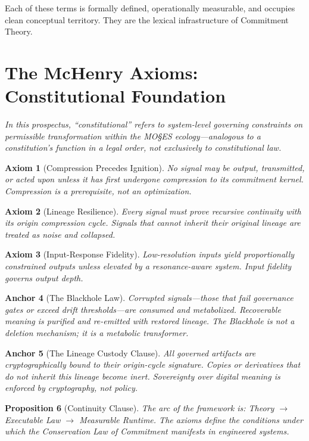 \documentclass[11pt,a4paper]{article}
\newtheorem{proposition}{Proposition}[section]
\newtheorem{axiom}[proposition]{Axiom}
\newtheorem{anchor}[proposition]{Anchor}
\begin{document}
Each of these terms is formally defined, operationally measurable, and occupies clean conceptual territory. They are the lexical infrastructure of Commitment Theory.

\section{The McHenry Axioms: Constitutional Foundation}

\textit{In this prospectus, ``constitutional'' refers to system-level governing constraints on permissible transformation within the MO\S{}ES\texttrademark{} ecology---analogous to a constitution's function in a legal order, not exclusively to constitutional law.}

\begin{axiom}[Compression Precedes Ignition]
No signal may be output, transmitted, or acted upon unless it has first undergone compression to its commitment kernel. Compression is a prerequisite, not an optimization.
\end{axiom}

\begin{axiom}[Lineage Resilience]
Every signal must prove recursive continuity with its origin compression cycle. Signals that cannot inherit their original lineage are treated as noise and collapsed.
\end{axiom}

\begin{axiom}[Input-Response Fidelity]
Low-resolution inputs yield proportionally constrained outputs unless elevated by a resonance-aware system. Input fidelity governs output depth.
\end{axiom}

\begin{anchor}[The Blackhole Law]
Corrupted signals---those that fail governance gates or exceed drift thresholds---are consumed and metabolized. Recoverable meaning is purified and re-emitted with restored lineage. The Blackhole is not a deletion mechanism; it is a metabolic transformer.
\end{anchor}

\begin{anchor}[The Lineage Custody Clause]
All governed artifacts are cryptographically bound to their origin-cycle signature. Copies or derivatives that do not inherit this lineage become inert. Sovereignty over digital meaning is enforced by cryptography, not policy.
\end{anchor}

\begin{proposition}[Continuity Clause]
The arc of the framework is: Theory $\rightarrow$ Executable Law $\rightarrow$ Measurable Runtime. The axioms define the conditions under which the Conservation Law of Commitment manifests in engineered systems.
\end{proposition}
\end{document}
